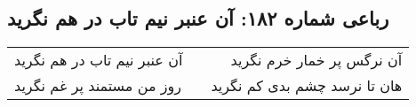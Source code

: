 \begin{center}
\section*{رباعی شماره ۱۸۲: آن عنبر نیم تاب در هم نگرید}
\label{sec:sh182}
\begin{longtable}{l p{0.5cm} r}
آن عنبر نیم تاب در هم نگرید
&&
آن نرگس پر خمار خرم نگرید
\\
روز من مستمند پر غم نگرید
&&
هان تا نرسد چشم بدی کم نگرید
\\
\end{longtable}
\end{center}
